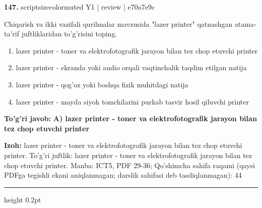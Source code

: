 \documentclass[10pt,a4paper]{article}
\begin{document}
{\bfseries\sffamily\color{ink} 147.} {scriptsizecolor{muted} Y1 | review | e70a7e9c}
\par
Chiqarish va ikki vazifali qurilmalar mavzusida "lazer printer" qatnashgan atama-ta'rif juftliklaridan to'g'risini toping.
\begin{enumerate}[label=\Alph*),leftmargin=9mm]
\item lazer printer - toner va elektrofotografik jarayon bilan tez chop etuvchi printer
\item lazer printer - ekranda yoki audio orqali vaqtinchalik taqdim etilgan natija
\item lazer printer - qog'oz yoki boshqa fizik muhitdagi natija
\item lazer printer - mayda siyoh tomchilarini purkab tasvir hosil qiluvchi printer
\end{enumerate}
\begin{tcolorbox}[enhanced,breakable,colback=teal!4,colframe=teal!60!black,boxrule=0.45pt,arc=1.2mm,left=2.7mm,right=2.7mm,top=1.8mm,bottom=1.8mm,before skip=2mm,after skip=2mm]
{\bfseries\sffamily\color{teal}To'g'ri javob:} \textbf{A) lazer printer - toner va elektrofotografik jarayon bilan tez chop etuvchi printer}
\par\smallskip
{\bfseries Izoh:} lazer printer - toner va elektrofotografik jarayon bilan tez chop etuvchi printer. To'g'ri juftlik: lazer printer - toner va elektrofotografik jarayon bilan tez chop etuvchi printer. Manba: ICT5, PDF 29-36; Qo'shimcha sahifa raqami (qaysi PDFga tegishli ekani aniqlanmagan; darslik sahifasi deb tasdiqlanmagan): 44
\end{tcolorbox}
\vspace{2mm}\hrule height 0.2pt\vspace{3mm}
\end{document}
